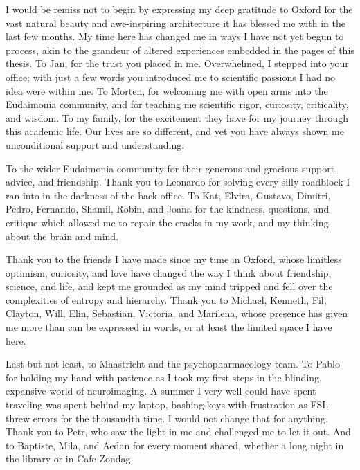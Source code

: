 \begin{acknowledgements}

I would be remiss not to begin by expressing my deep gratitude to Oxford for the vast natural beauty and awe-inspiring architecture it has blessed me with in the last few months. My time here has changed me in ways I have not yet begun to process, akin to the grandeur of altered experiences embedded in the pages of this thesis. To Jan, for the trust you placed in me. Overwhelmed, I stepped into your office;  with just a few words you introduced me to scientific passions I had no idea were within me. To Morten, for welcoming me with open arms into the Eudaimonia community, and for teaching me scientific rigor, curiosity, criticality, and wisdom. To my family, for the excitement they have for my journey through this academic life. Our lives are so different, and yet you have always shown me unconditional support and understanding.

To the wider Eudaimonia community for their generous and gracious support, advice, and friendship. Thank you to Leonardo for solving every silly roadblock I ran into in the darkness of the back office. To Kat, Elvira, Gustavo, Dimitri, Pedro, Fernando, Shamil, Robin, and Joana for the kindness, questions, and critique which allowed me to repair the cracks in my work, and my thinking about the brain and mind.

Thank you to the friends I have made since my time in Oxford, whose limitless optimism, curiosity, and love have changed the way I think about friendship, science, and life, and kept me grounded as my mind tripped and fell over the complexities of entropy and hierarchy. Thank you to Michael, Kenneth, Fil, Clayton, Will, Elin, Sebastian, Victoria, and Marilena, whose presence has given me more than can be expressed in words, or at least the limited space I have here.

Last but not least, to Maastricht and the psychopharmacology team. To Pablo for holding my hand with patience as I took my first steps in the blinding, expansive world of neuroimaging. A summer I very well could have spent traveling was spent behind my laptop, bashing keys with frustration as FSL threw errors for the thousandth time. I would not change that for anything. Thank you to Petr, who saw the light in me and challenged me to let it out. And to Baptiste, Mila, and Aedan for every moment shared, whether a long night in the library or in Cafe Zondag.
\end{acknowledgements}